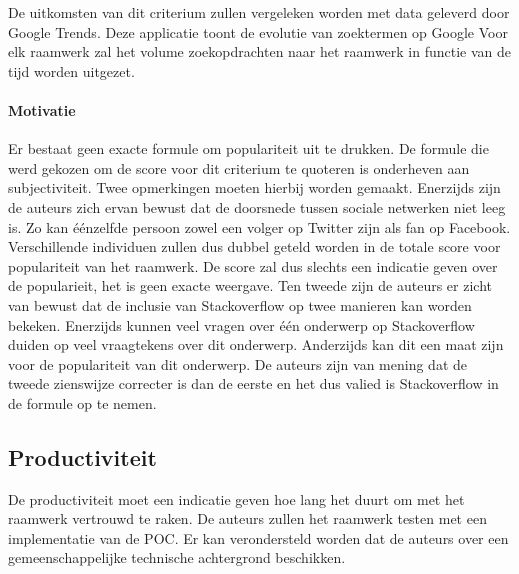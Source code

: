 De uitkomsten van dit criterium zullen vergeleken worden met data geleverd door Google Trends. %
Deze applicatie toont de evolutie van zoektermen op Google
Voor elk raamwerk zal het volume zoekopdrachten naar het raamwerk in functie van de tijd worden uitgezet.

\paragraph{Motivatie}

Er bestaat geen exacte formule om populariteit uit te drukken.
De formule die werd gekozen om de score voor dit criterium te quoteren is onderheven aan subjectiviteit.
Twee opmerkingen moeten hierbij worden gemaakt.
Enerzijds zijn de auteurs zich ervan bewust dat de doorsnede tussen sociale netwerken niet leeg is.
Zo kan éénzelfde persoon zowel een volger op Twitter zijn als fan op Facebook.
Verschillende individuen zullen dus dubbel geteld worden in de totale score voor populariteit van het raamwerk.
De score zal dus slechts een indicatie geven over de popularieit,  het is geen exacte weergave.
Ten tweede zijn de auteurs er zicht van bewust dat de inclusie van Stackoverflow op twee manieren kan worden bekeken.
Enerzijds kunnen veel vragen over één onderwerp op Stackoverflow duiden op veel vraagtekens over dit onderwerp.
Anderzijds kan dit een maat zijn voor de populariteit van dit onderwerp.
De auteurs zijn van mening dat de tweede zienswijze correcter is dan de eerste en het dus valied is Stackoverflow in de formule op te nemen.


\subsection{Productiviteit}
\label{sec:vergelijking-productiviteit}
De productiviteit moet een indicatie geven hoe lang het duurt om met het raamwerk vertrouwd te raken.
De auteurs zullen het raamwerk testen met een implementatie van de POC.
Er kan verondersteld worden dat de auteurs over een gemeenschappelijke technische achtergrond beschikken.

